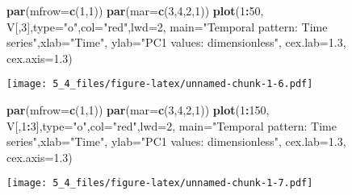 \documentclass[]{article}
\newenvironment{Shaded}{\begin{snugshade}}{\end{snugshade}}
\newcommand{\KeywordTok}[1]{\textcolor[rgb]{0.13,0.29,0.53}{\textbf{#1}}}
\newcommand{\DataTypeTok}[1]{\textcolor[rgb]{0.13,0.29,0.53}{#1}}
\newcommand{\DecValTok}[1]{\textcolor[rgb]{0.00,0.00,0.81}{#1}}
\newcommand{\FloatTok}[1]{\textcolor[rgb]{0.00,0.00,0.81}{#1}}
\newcommand{\StringTok}[1]{\textcolor[rgb]{0.31,0.60,0.02}{#1}}
\newcommand{\OperatorTok}[1]{\textcolor[rgb]{0.81,0.36,0.00}{\textbf{#1}}}
\newcommand{\NormalTok}[1]{#1}
\begin{document}
\begin{Shaded}
\begin{Highlighting}[]
\KeywordTok{par}\NormalTok{(}\DataTypeTok{mfrow=}\KeywordTok{c}\NormalTok{(}\DecValTok{1}\NormalTok{,}\DecValTok{1}\NormalTok{))}
\KeywordTok{par}\NormalTok{(}\DataTypeTok{mar=}\KeywordTok{c}\NormalTok{(}\DecValTok{3}\NormalTok{,}\DecValTok{4}\NormalTok{,}\DecValTok{2}\NormalTok{,}\DecValTok{1}\NormalTok{))}
\KeywordTok{plot}\NormalTok{(}\DecValTok{1}\OperatorTok{:}\DecValTok{50}\NormalTok{, V[,}\DecValTok{3}\NormalTok{],}\DataTypeTok{type=}\StringTok{"o"}\NormalTok{,}\DataTypeTok{col=}\StringTok{"red"}\NormalTok{,}\DataTypeTok{lwd=}\DecValTok{2}\NormalTok{,}
     \DataTypeTok{main=}\StringTok{"Temporal pattern: Time series"}\NormalTok{,}\DataTypeTok{xlab=}\StringTok{"Time"}\NormalTok{,}
     \DataTypeTok{ylab=}\StringTok{"PC1 values: dimensionless"}\NormalTok{,}
     \DataTypeTok{cex.lab=}\FloatTok{1.3}\NormalTok{, }\DataTypeTok{cex.axis=}\FloatTok{1.3}\NormalTok{)}
\end{Highlighting}
\end{Shaded}

\texttt{[image: 5\_4\_files/figure-latex/unnamed-chunk-1-6.pdf]}

\begin{Shaded}
\begin{Highlighting}[]
\KeywordTok{par}\NormalTok{(}\DataTypeTok{mfrow=}\KeywordTok{c}\NormalTok{(}\DecValTok{1}\NormalTok{,}\DecValTok{1}\NormalTok{))}
\KeywordTok{par}\NormalTok{(}\DataTypeTok{mar=}\KeywordTok{c}\NormalTok{(}\DecValTok{3}\NormalTok{,}\DecValTok{4}\NormalTok{,}\DecValTok{2}\NormalTok{,}\DecValTok{1}\NormalTok{))}
\KeywordTok{plot}\NormalTok{(}\DecValTok{1}\OperatorTok{:}\DecValTok{150}\NormalTok{, V[,}\DecValTok{1}\OperatorTok{:}\DecValTok{3}\NormalTok{],}\DataTypeTok{type=}\StringTok{"o"}\NormalTok{,}\DataTypeTok{col=}\StringTok{"red"}\NormalTok{,}\DataTypeTok{lwd=}\DecValTok{2}\NormalTok{,}
     \DataTypeTok{main=}\StringTok{"Temporal pattern: Time series"}\NormalTok{,}\DataTypeTok{xlab=}\StringTok{"Time"}\NormalTok{,}
     \DataTypeTok{ylab=}\StringTok{"PC1 values: dimensionless"}\NormalTok{,}
     \DataTypeTok{cex.lab=}\FloatTok{1.3}\NormalTok{, }\DataTypeTok{cex.axis=}\FloatTok{1.3}\NormalTok{)}
\end{Highlighting}
\end{Shaded}

\texttt{[image: 5\_4\_files/figure-latex/unnamed-chunk-1-7.pdf]}
\end{document}

